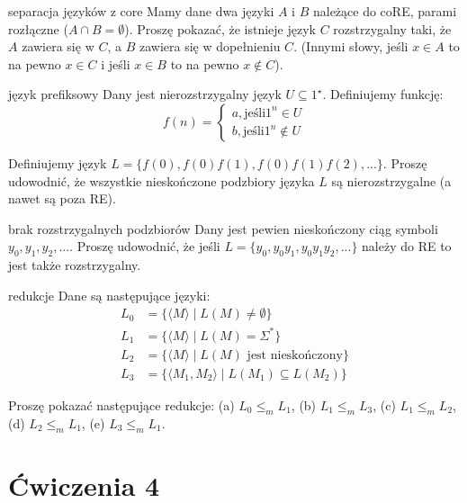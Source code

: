 \begin{exercise}{separacja języków z core}
    Mamy dane dwa języki $A$ i $B$ należące do coRE, parami rozłączne ($A \cap B = \emptyset$). Proszę pokazać, że istnieje język $C$ rozstrzygalny taki, że $A$ zawiera się w $C$, a $B$ zawiera się w dopełnieniu $C$. (Innymi słowy, jeśli $x \in A$
 to na pewno $x \in C$ i jeśli $x \in B$ to na pewno $x \notin C$).
\end{exercise}

\begin{exercise}{język prefiksowy}
    Dany jest nierozstrzygalny język $U\subseteq1^\star$. Definiujemy funkcję:
$$
f(n)= 
    \begin{cases}
        a, \text{jeśli} 1^n \in U \\
        b, \text{jeśli} 1^n \notin U
    \end{cases}
$$

Definiujemy język $L=\{f(0),f(0)f(1),f(0)f(1)f(2),...\}$. Proszę udowodnić, że wszystkie nieskończone podzbiory języka $L$ są nierozstrzygalne (a nawet są poza RE).
\end{exercise}

\begin{exercise}{brak rozstrzygalnych podzbiorów}
    Dany jest pewien nieskończony ciąg symboli $y_0,y_1,y_2,...$. Proszę udowodnić, że jeśli $L = \{y_0,y_0y_1,y_0y_1y_2,...\}$ należy do RE to jest także rozstrzygalny.
\end{exercise}

\begin{exercise}{redukcje}
Dane są następujące języki:
\begin{align*}
L_0 &= \{\langle M \rangle \mid L(M) \neq \emptyset \} \\
L_1 &= \{\langle M \rangle \mid L(M) = \Sigma^* \} \\
L_2 &= \{\langle M \rangle \mid L(M) \text{ jest nieskończony} \} \\
L_3 &= \{\langle M_1, M_2 \rangle \mid L(M_1) \subseteq L(M_2) \}
\end{align*}

Proszę pokazać następujące redukcje:
(a) $L_0 \leq_m L_1$,  
(b) $L_1 \leq_m L_3$,  
(c) $L_1 \leq_m L_2$,  
(d) $L_2 \leq_m L_1$,  
(e) $L_3 \leq_m L_1$.
    
\end{exercise}

\section{Ćwiczenia 4}

